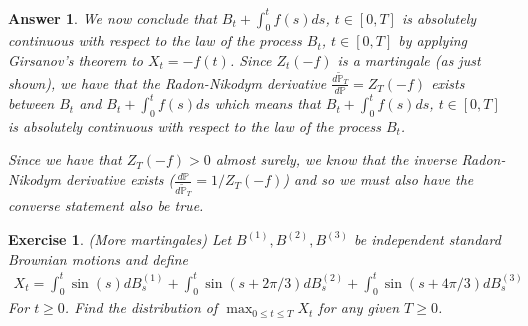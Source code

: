 \documentclass[12pt]{article}
\theoremstyle{colon}
\newtheorem{exercise}{Exercise}
\newtheorem*{answer}{Answer}
\begin{document}
\begin{answer}
  We now conclude that $B_t + \int_0^t f(s) ds$, $t \in [0,T]$ is absolutely continuous with respect to the law of the process $B_t$, $t \in [0,T]$ by applying Girsanov's theorem to $X_t = -f(t)$. Since $Z_t(-f)$ is a martingale (as just shown), we have that the Radon-Nikodym derivative $\frac{d \tilde{\mathbb{P}}_T}{d \mathbb{P}} = Z_T(-f)$ exists between $B_t$ and $B_t + \int_0^t f(s) ds$ which means that $B_t + \int_0^t f(s) ds$, $t \in [0,T]$ is absolutely continuous with respect to the law of the process $B_t$.

  Since we have that $Z_T(-f) > 0$ almost surely, we know that the inverse Radon-Nikodym derivative exists ($\frac{d \mathbb{P}}{d \tilde{\mathbb{P}}_T} = 1/Z_T(-f)$) and so we must also have the converse statement also be true.
\end{answer}

\clearpage

\begin{exercise}
  (More martingales) Let $B^{(1)}, B^{(2)}, B^{(3)}$ be independent standard Brownian motions and define
  \begin{gather*}
      X_t = \int_0^t \sin (s) d B_s^{(1)} + \int_0^t \sin (s + 2\pi/3) d B_s^{(2)} + \int_0^t \sin (s + 4\pi/3) d B_s^{(3)}
  \end{gather*}
  For $t \geq 0$. Find the distribution of $\max_{0 \leq t \leq T} X_t$ for any given $T \geq 0$.
\end{exercise}
\end{document}
